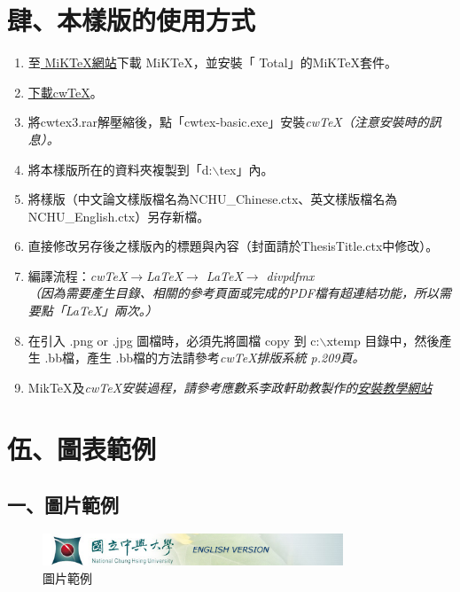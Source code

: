 \documentclass[12pt,oneside,openany,a4paper]{book}
\begin{document}
\chapter{肆、本樣版的使用方式}
\begin{enumerate}
    \item 至\href{http://www.miktex.org/}{ MiKTeX網站}下載 MiK\TeX ，並安裝「 Total」的MiK\TeX 套件。
    \item \href{http://www.amath.nchu.edu.tw/~u4815977/cwtex3.rar}{下載cw\TeX}。
    \item 將cwtex3.rar解壓縮後，點「cwtex-basic.exe」安裝\it{cw}\TeX （注意安裝時的訊息）。
    \item 將本樣版所在的資料夾複製到「d:$\backslash$tex」內。
    \item 將樣版（中文論文樣版檔名為NCHU\_Chinese.ctx、英文樣版檔名為NCHU\_English.ctx）另存新檔。
    \item 直接修改另存後之樣版內的標題與內容（封面請於ThesisTitle.ctx中修改）。
    \item 編譯流程：\it{cw}\TeX $\rightarrow$\LaTeX $\rightarrow$ \LaTeX $\rightarrow$ divpdfmx\\
        （因為需要產生目錄、相關的參考頁面或完成的PDF檔有超連結功能，所以需要點「\LaTeX 」兩次。）
    \item 在引入 .png or .jpg 圖檔時，必須先將圖檔 copy 到 c:$\backslash$xtemp 目錄中，然後產生 .bb檔，產生 .bb檔的方法請參考\it{cw}\TeX 排版系統 p.209頁。
    \item Mik\TeX 及\it{cw}\TeX 安裝過程，請參考應數系李政軒助教製作的\href{http://www.amath.nchu.edu.tw/~u4815977/How_to_Install_cwTeX/How_to_Install_cwTeX.html}{安裝教學網站}
\end{enumerate}

\chapter{伍、圖表範例}
\section{一、圖片範例}
\begin{figure}[h]
    \begin{center}
        \includegraphics[bb=0 0 527 56,width=0.8\textwidth]{NCHU_Logo.jpg}
    \end{center}
    \caption{圖片範例}
\end{figure}
\end{document}

